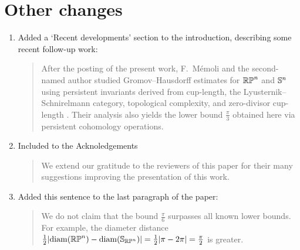\documentclass{amsart}
\begin{document}
	\section{Other changes}

	\begin{enumerate}
		\item Added a `Recent developments' section to the introduction, describing some recent follow-up work:
		\medskip
		\begin{quote}
			After the posting of the present work, F.~M\'emoli and the second-named author studied Gromov--Hausdorff estimates for \(\mathbb{RP}^n\) and \(\mathbb{S}^n\) using persistent invariants derived from cup-length, the Lyusternik--Schnirelmann category, topological complexity, and zero-divisor cup-length \cite{memoli2025persistence}.
			Their analysis also yields the lower bound \(\frac{\pi}{3}\) obtained here via persistent cohomology operations.
		\end{quote}

		\item Included to the Acknoledgements
		\medskip
		\begin{quote}
			We extend our gratitude to the reviewers of this paper for their many suggestions improving the presentation of this work.
		\end{quote}

		\item Added this sentence to the last paragraph of the paper:
		\medskip
		\begin{quote}
			We do not claim that the bound \(\frac{\pi}{6}\) surpasses all known lower bounds.
			For example, the diameter distance \(\frac{1}{2} \lvert \operatorname{diam}(\mathbb{RP}^n) - \operatorname{diam}(\mathbb{S}_{\mathbb{RP}^n}) \rvert = \frac{1}{2} \lvert \pi - 2\pi \rvert = \frac{\pi}{2}\) is greater.
		\end{quote}
	\end{enumerate}
\end{document}
